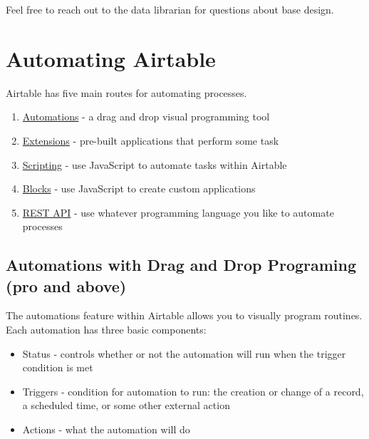 \documentclass[
]{book}
\providecommand{\tightlist}{%
  \setlength{\itemsep}{0pt}\setlength{\parskip}{0pt}}
\begin{document}
Feel free to reach out to the data librarian for questions about base design.

\hypertarget{automating-airtable}{%
\section{Automating Airtable}\label{automating-airtable}}

Airtable has five main routes for automating processes.

\begin{enumerate}
\def\labelenumi{\arabic{enumi})}
\tightlist
\item
  \href{https://support.airtable.com/hc/en-us/articles/360050974153-Automations-overview}{Automations} - a drag and drop visual programming tool
\item
  \href{https://support.airtable.com/docs/airtable-extensions-overview}{Extensions} - pre-built applications that perform some task
\item
  \href{https://support.airtable.com/hc/en-us/articles/360043041074-Scripting-app-overview}{Scripting} - use JavaScript to automate tasks within Airtable
\item
  \href{https://www.airtable.com/developers/apps/guides/getting-started}{Blocks} - use JavaScript to create custom applications
\item
  \href{https://airtable.com/api}{REST API} - use whatever programming language you like to automate processes
\end{enumerate}

\hypertarget{automations-with-drag-and-drop-programing-pro-and-above}{%
\subsection{Automations with Drag and Drop Programing (pro and above)}\label{automations-with-drag-and-drop-programing-pro-and-above}}

The automations feature within Airtable allows you to visually program routines. Each automation has three basic components:

\begin{itemize}
\tightlist
\item
  Status - controls whether or not the automation will run when the trigger condition is met
\item
  Triggers - condition for automation to run: the creation or change of a record, a scheduled time, or some other external action
\item
  Actions - what the automation will do
\end{itemize}
\end{document}
